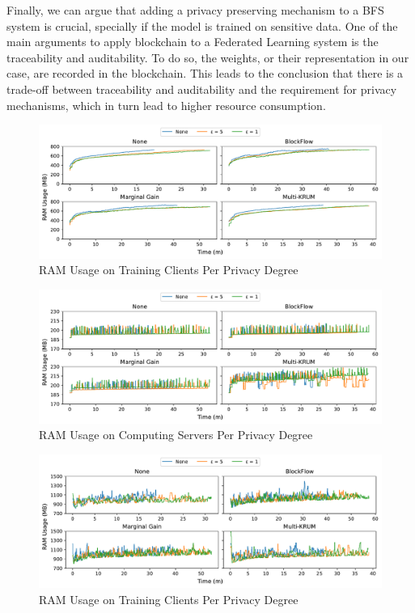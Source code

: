 Finally, we can argue that adding a privacy preserving mechanism to a BFS system is crucial, specially if the model is trained on sensitive data. One of the main arguments to apply blockchain to a Federated Learning system is the traceability and auditability. To do so, the weights, or their representation in our case, are recorded in the blockchain. This leads to the conclusion that there is a trade-off between traceability and auditability and the requirement for privacy mechanisms, which in turn lead to higher resource consumption.

\clearpage

\begin{figure}[!h]
    \centering
    \includegraphics[width=\textwidth]{graphics/privacy/ram_client.pdf}
    \caption{RAM Usage on Training Clients Per Privacy Degree}
    \label{fig:ram_privacy_clients}
\end{figure}

\vfill

\begin{figure}[!h]
    \centering
    \includegraphics[width=\textwidth]{graphics/privacy/ram_server.pdf}
    \caption{RAM Usage on Computing Servers Per Privacy Degree}
    \label{fig:ram_privacy_servers}
\end{figure}

\vfill

\begin{figure}[!h]
    \centering
    \includegraphics[width=\textwidth]{graphics/privacy/ram_miner.pdf}
    \caption{RAM Usage on Training Clients Per Privacy Degree}
    \label{fig:ram_privacy_miners}
\end{figure}

